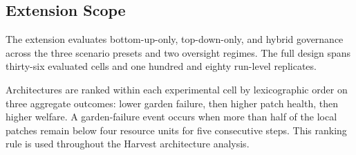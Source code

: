 \subsection{Extension Scope}

The extension evaluates bottom-up-only, top-down-only, and hybrid governance across the three scenario presets and two oversight regimes. The full design spans thirty-six evaluated cells and one hundred and eighty run-level replicates.

Architectures are ranked within each experimental cell by lexicographic order on three aggregate outcomes: lower garden failure, then higher patch health, then higher welfare. A garden-failure event occurs when more than half of the local patches remain below four resource units for five consecutive steps. This ranking rule is used throughout the Harvest architecture analysis.
